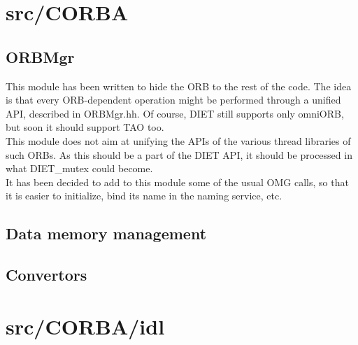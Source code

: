   \section{\textsf{src/CORBA}}
  \label{s:CORBA}

  \subsection{\textsf{ORBMgr}}

  This module has been written to hide the ORB to the rest of the code. The idea
  is that every ORB-dependent operation might be performed through a unified API,
  described in \textsf{ORBMgr.hh}. Of course, DIET still supports only omniORB,
  but soon it should support TAO too.
  \\
  This module does not aim at unifying the APIs of the various thread libraries of
  such ORBs. As this should be a part of the DIET API, it should be processed in
  what \textsf{DIET\_mutex} could become.
  \\
  It has been decided to add to this module some of the usual OMG calls, so that
  it is easier to initialize, bind its name in the naming service, etc.


  \subsection{Data memory management}



  \subsection{Convertors}




  \section{\textsf{src/CORBA/idl}}
  \label{s:IDL}

